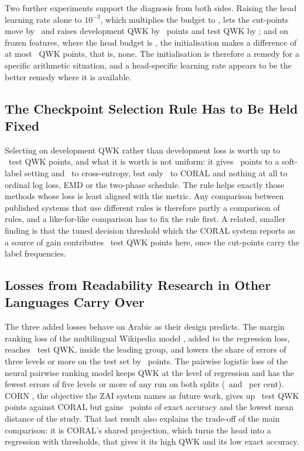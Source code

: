 Two further experiments support the diagnosis from both sides. Raising the head learning rate
alone to $10^{-3}$, which multiplies the budget to \lrSumHeadlr, lets the cut-points move by
\cutMoveCoralHeadlr\ and raises development QWK by \coralHeadlrDevGain\ points and test QWK by
\coralHeadlrTestGain; and on frozen features, where the head budget is \cpuLrSum, the
initialisation makes a difference of at most \cpuZeroInitDiffMean\ QWK points, that is, none.
The initialisation is therefore a remedy for a specific arithmetic situation, and a
head-specific learning rate appears to be the better remedy where it is available.

\subsection{The Checkpoint Selection Rule Has to Be Held Fixed}

Selecting on development QWK rather than development loss is worth up to
\qwkselTestGainMax\ test QWK points, and what it is worth is not uniform: it gives
\qwkselTestGainSoftThree\ points to a soft-label setting and \qwkselTestGainCE\ to
cross-entropy, but only \qwkselTestGainCoral\ to CORAL and nothing at all to ordinal log loss,
EMD or the two-phase schedule. The rule helps exactly those methods whose loss is least aligned
with the metric. Any comparison between published systems that use different rules is therefore
partly a comparison of rules, and a like-for-like comparison has to fix the rule first. A
related, smaller finding is that the tuned decision threshold which the CORAL system reports as
a source of gain contributes \zaiTestGainCoral\ test QWK points here, once the cut-points carry
the label frequencies.

\subsection{Losses from Readability Research in Other Languages Carry Over}

The three added losses behave on Arabic as their design predicts. The margin ranking loss of the multilingual Wikipedia model
\cite{trokhymovych2024readability}, added to the regression loss, reaches \nlTestQwkRank\ test QWK,
inside the leading group, and lowers the share of errors of three levels or more on the test set
by \nlAbsDeltaTestFarThreeRank\ points. The pairwise logistic loss of the neural pairwise ranking
model \cite{lee2022neural} keeps QWK at the level of regression and has the fewest errors of five
levels or more of any run on both splits (\nlDevFarFivePlr\ and \nlTestFarFivePlr\ per cent).
CORN \cite{shi2023corn}, the objective the ZAI system names as future work, gives up
\nlAbsDeltaTestQwkCorn\ test QWK points against CORAL but gains \nlAbsDeltaTestAccCorn\ points of
exact accuracy and the lowest mean distance of the study. That last result also explains the
trade-off of the main comparison: it is CORAL's shared projection, which turns the head into a
regression with thresholds, that gives it its high QWK and its low exact accuracy.

